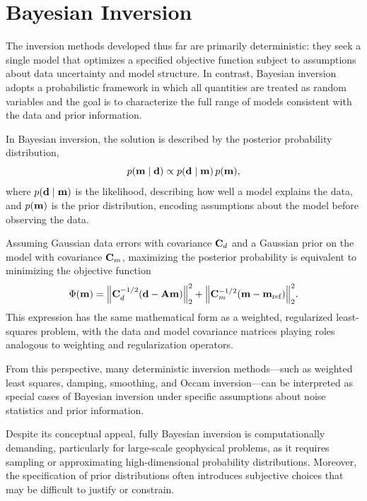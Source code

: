 \section{Bayesian Inversion}

The inversion methods developed thus far are primarily deterministic: they seek a single model that optimizes a specified objective function subject to assumptions about data uncertainty and model structure. In contrast, Bayesian inversion adopts a probabilistic framework in which all quantities are treated as random variables and the goal is to characterize the full range of models consistent with the data and prior information.

In Bayesian inversion, the solution is described by the posterior probability distribution,
\begin{equation}
    p(\vb{m} \mid \vb{d}) \propto p(\vb{d} \mid \vb{m}) \, p(\vb{m}),
\end{equation}
where $p(\vb{d} \mid \vb{m})$ is the likelihood, describing how well a model explains the data, and $p(\vb{m})$ is the prior distribution, encoding assumptions about the model before observing the data.

Assuming Gaussian data errors with covariance $\vb{C}_d$ and a Gaussian prior on the model with covariance $\vb{C}_m$, maximizing the posterior probability is equivalent to minimizing the objective function
\begin{equation}
    \Phi(\vb{m}) =
    \norm{\vb{C}_d^{-1/2}(\vb{d} - \vb{A}\vb{m})}_2^2
    + \norm{\vb{C}_m^{-1/2}(\vb{m} - \vb{m}_\text{ref})}_2^2.
\end{equation}
This expression has the same mathematical form as a weighted, regularized least-squares problem, with the data and model covariance matrices playing roles analogous to weighting and regularization operators.

From this perspective, many deterministic inversion methods—such as weighted least squares, damping, smoothing, and Occam inversion—can be interpreted as special cases of Bayesian inversion under specific assumptions about noise statistics and prior information.

Despite its conceptual appeal, fully Bayesian inversion is computationally demanding, particularly for large-scale geophysical problems, as it requires sampling or approximating high-dimensional probability distributions. Moreover, the specification of prior distributions often introduces subjective choices that may be difficult to justify or constrain.

